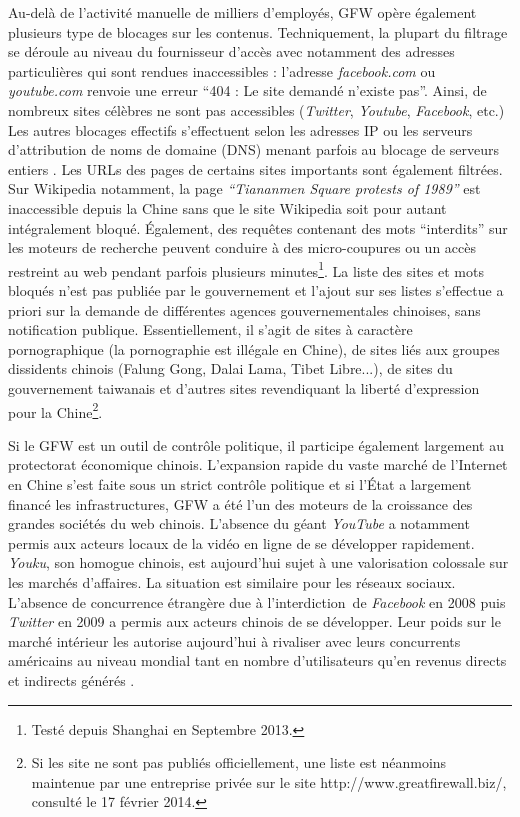 Au-delà de l’activité manuelle de milliers d’employés, GFW opère également plusieurs type de blocages sur les contenus. Techniquement, la plupart du filtrage se déroule au niveau du fournisseur d’accès avec notamment des adresses particulières qui sont rendues inaccessibles : l’adresse \textit{facebook.com} ou \textit{youtube.com} renvoie une erreur “404 : Le site demandé n’existe pas”. Ainsi, de nombreux sites célèbres ne sont pas accessibles (\textit{Twitter}, \textit{Youtube}, \textit{Facebook}, etc.) Les autres blocages effectifs s’effectuent selon les adresses IP ou les serveurs d’attribution de noms de domaine (DNS) menant parfois au blocage de serveurs entiers \citep{Winter2012}. Les URLs des pages de certains sites importants sont également filtrées. Sur Wikipedia notamment, la page \textit{“Tiananmen Square protests of 1989”} est inaccessible depuis la Chine sans que le site Wikipedia soit pour autant intégralement bloqué. Également, des requêtes contenant des mots “interdits” sur les moteurs de recherche peuvent conduire à des micro-coupures ou un accès restreint au web pendant parfois plusieurs minutes\footnote{Testé depuis Shanghai en Septembre 2013.}. La liste des sites et mots bloqués n’est pas publiée par le gouvernement et l’ajout sur ses listes s’effectue a priori sur la demande de différentes agences gouvernementales chinoises, sans notification publique. Essentiellement, il s’agit de sites à caractère pornographique (la pornographie est illégale en Chine), de sites liés aux groupes dissidents chinois (Falung Gong, Dalai Lama, Tibet Libre...), de sites du gouvernement taiwanais et d’autres sites revendiquant la liberté d’expression pour la Chine\footnote{Si les site ne sont pas publiés officiellement, une liste est néanmoins maintenue par une entreprise privée sur le site http://www.greatfirewall.biz/, consulté le 17 février 2014.}.

Si le GFW est un outil de contrôle politique, il participe également largement au protectorat économique chinois. L’expansion rapide du vaste marché de l'Internet en Chine s’est faite sous un strict contrôle politique et si l’État a largement financé les infrastructures, GFW a été l’un des moteurs de la croissance des grandes sociétés du web chinois. L'absence du géant \textit{YouTube} a notamment permis aux acteurs locaux de la vidéo en ligne de se développer rapidement. \textit{Youku}, son homogue chinois, est aujourd’hui sujet à une valorisation colossale sur les marchés d’affaires. La situation est similaire pour les réseaux sociaux. L'absence de concurrence étrangère due à l’interdiction de \textit{Facebook} en 2008 puis \textit{Twitter} en 2009 a permis aux acteurs chinois de se développer. Leur poids sur le marché intérieur les autorise aujourd’hui à rivaliser avec leurs concurrents américains au niveau mondial tant en nombre d’utilisateurs qu’en revenus directs et indirects générés \citep{CIW2012}.

